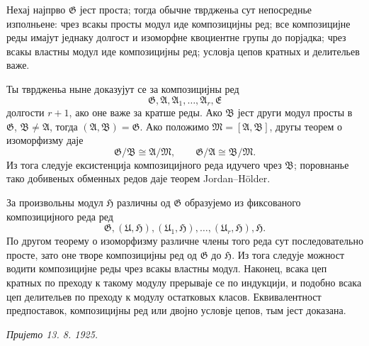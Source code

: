 \documentclass[11pt]{article}
\providecommand{\mG}{\mathfrak{G}}
\providecommand{\mU}{\mathfrak{U}}
\providecommand{\mE}{\mathfrak{E}}
\providecommand{\mA}{\mathfrak{A}}
\providecommand{\mB}{\mathfrak{B}}
\providecommand{\mM}{\mathfrak{M}}
\providecommand{\mH}{\mathfrak{H}}
\begin{document}
Нехај најпрво $\mG$ јест проста; тогда обычне тврдженьа сут непосреднье изполньене: чрез всакы просты модул иде композицијны ред; все композицијне реды имајут једнаку долгост и изоморфне квоциентне групы до порјадка; чрез всакы властны модул иде композицијны ред; условја цепов кратных и делительев важе.

Ты тврдженьа ныне доказујут се за композицијны ред
\[
        \mG,\mA,\mA_1,\ldots,\mA_r,\mE
\]
долгости $r+1$, ако оне важе за кратше реды. Ако $\mB$ јест други модул просты в $\mG$, $\mB\ne\mA$, тогда $(\mA,\mB)=\mG$. Ако положимо $\mM=[\mA,\mB]$, другы теорем о изоморфизму даје
\[
        \mG/\mB\cong\mA/\mM,
        \qquad
        \mG/\mA\cong\mB/\mM.
\]
Из тога следује ексистенција композицијного реда идучего чрез $\mB$; поровнанье тако добивеных обменных редов даје теорем Jordan--Hölder.

За произвольны модул $\mH$ различны од $\mG$ образујемо из фиксованого композицијного реда ред
\[
        \mG,(\mU,\mH),(\mU_1,\mH),\ldots,(\mU_r,\mH),\mH.
\]
По другом теорему о изоморфизму различне члены того реда сут последовательно просте, зато оне творе композицијны ред од $\mG$ до $\mH$. Из тога следује можност водити композицијне реды чрез всакы властны модул. Наконец, всака цеп кратных по преходу к такому модулу прерываје се по индукцији, и подобно всака цеп делительев по преходу к модулу остатковых класов. Еквивалентност предпоставок, композицијны ред или двојно условје цепов, тым јест доказана.

\emph{Пријето 13. 8. 1925.}
\end{document}
